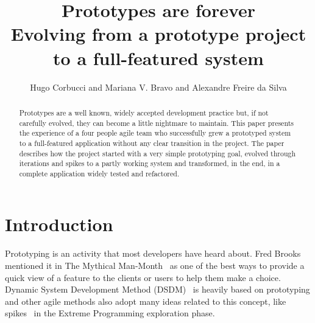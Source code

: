 \documentclass[lnbip]{svmultln}
\begin{document}
%
\mainmatter %
%
\title{Prototypes are forever\\
  Evolving from a prototype project\\ to a full-featured system}
%
%
\author{Hugo Corbucci and Mariana V. Bravo  and
  Alexandre Freire da Silva}
%
%
%

\maketitle %

\begin{abstract} %
  Prototypes are a well known, widely accepted development practice
  but, if not carefully evolved, they can become a little nightmare to
  maintain. This paper presents the experience of a four people agile
  team who successfully grew a prototyped system to a
  full-featured application without any clear transition in the
  project. The paper describes how the project started with a very
  simple prototyping goal, evolved through iterations and spikes to a
  partly working system and transformed, in the end, in a complete
  application widely tested and refactored.

\end{abstract}
%
\section{Introduction}

Prototyping is an activity that most developers have heard about. Fred
Brooks mentioned it in The Mythical Man-Month~\cite{Brooks1975} as one
of the best ways to provide a quick view of a feature to the clients
or users to help them make a choice. Dynamic System Development Method
(DSDM)~\cite{DSDM} is heavily based on prototyping and other agile
methods also adopt many ideas related to this concept, like
spikes~\cite{XP} in the Extreme Programming exploration
phase.
\end{document}
